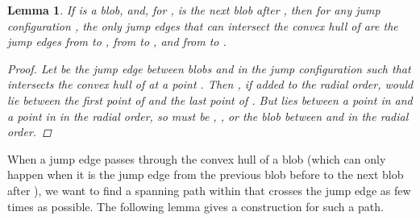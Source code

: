 \documentclass[12pt]{article}
\newtheorem{lemma}{Lemma}
\theoremstyle{definition}
\begin{document}
\begin{lemma}
  \label{lem:jump-config-cross-blob}
  If  is a blob, and, for ,  is the next blob after , then for any jump configuration , the only jump edges that can intersect the convex hull of  are the jump edges from  to , from  to , and from  to .

  \begin{proof}
    Let  be the jump edge between blobs  and  in the jump configuration  such that  intersects the convex hull of  at a point .
    Then , if added to the radial order, would lie between the first point of  and the last point of .
    But  lies between a point in  and a point in  in the radial order, so  must be , , or the blob between  and  in the radial order.
  \end{proof}
\end{lemma}

When a jump edge passes through the convex hull of a blob  (which can only happen when it is the jump edge from the previous blob before  to the next blob after ), we want to find a spanning path within  that crosses the jump edge as few times as possible. The following lemma gives a construction for such a path.
\end{document}
